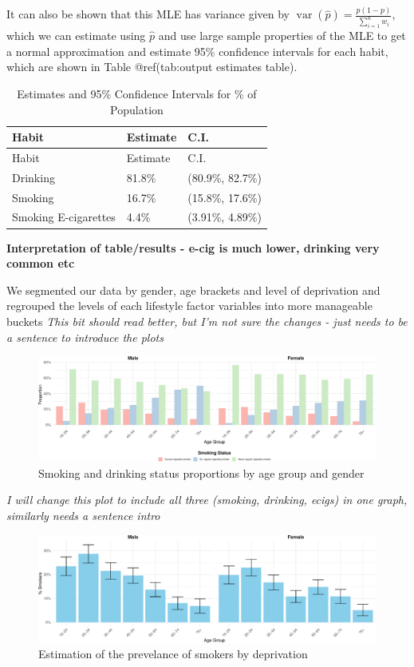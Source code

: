 \documentclass[
  11pt,
]{article}
\begin{document}
It can also be shown that this MLE has variance given by
\(\mathop{\mathrm{var}}(\widehat{p})=\frac{p(1-p)}{\sum_{i=1}^{n}w_i}\),
which we can estimate using \(\widehat{p}\) and use large sample
properties of the MLE to get a normal approximation and estimate 95\%
confidence intervals for each habit, which are shown in Table
@ref(tab:output estimates table).

\begin{longtable}[]{@{}lll@{}}
\caption{Estimates and 95\% Confidence Intervals for \% of
Population}\tabularnewline
\toprule\noalign{}
Habit & Estimate & C.I. \\
\midrule\noalign{}
\endfirsthead
\toprule\noalign{}
Habit & Estimate & C.I. \\
\midrule\noalign{}
\endhead
\bottomrule\noalign{}
\endlastfoot
Drinking & 81.8\% & (80.9\%, 82.7\%) \\
Smoking & 16.7\% & (15.8\%, 17.6\%) \\
Smoking E-cigarettes & 4.4\% & (3.91\%, 4.89\%) \\
\end{longtable}

\textbf{Interpretation of table/results - e-cig is much lower, drinking
very common etc}

We segmented our data by gender, age brackets and level of deprivation
and regrouped the levels of each lifestyle factor variables into more
manageable buckets \emph{This bit should read better, but I'm not sure
the changes - just needs to be a sentence to introduce the plots}

\begin{figure}[H]
\includegraphics{Coursework_files/figure-latex/output smoking and drinking by age plot-1} \caption{Smoking and drinking status proportions by age group and gender}\label{fig:output smoking and drinking by age plot}
\end{figure}

\emph{I will change this plot to include all three (smoking, drinking,
ecigs) in one graph, similarly needs a sentence intro}

\begin{figure}[H]
\includegraphics{Coursework_files/figure-latex/output prevelance plot-1} \caption{Estimation of the prevelance of smokers by deprivation}\label{fig:output prevelance plot}
\end{figure}
\end{document}

